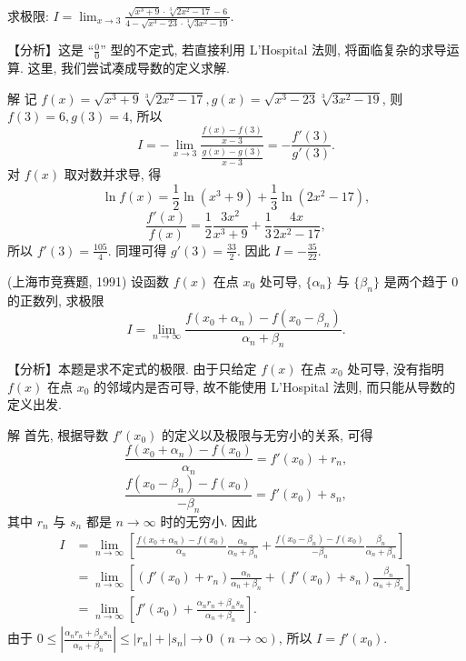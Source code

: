 \documentclass[lang=cn,newtx,10pt,scheme=chinese]{elegantbook}
\begin{document}
\begin{example}
  求极限: $I = \lim_{x \to 3} \frac{\sqrt{x^3 + 9} \cdot \sqrt[3]{2x^2 - 17} - 6}{4 - \sqrt{x^3 - 23} \cdot \sqrt[3]{3x^2 - 19}}$.
\end{example}
\begin{solution}
  【分析】这是 “$\frac{0}{0}$” 型的不定式, 若直接利用 L'Hospital 法则, 将面临复杂的求导运算. 这里, 我们尝试凑成导数的定义求解.

  解 记 $f(x) = \sqrt{x^3 + 9} \sqrt[3]{2x^2 - 17}, g(x) = \sqrt{x^3 - 23} \sqrt[3]{3x^2 - 19}$, 则 $f(3) = 6, g(3) = 4$, 所以
  $$
  I = -\lim_{x \to 3} \frac{\frac{f(x) - f(3)}{x - 3}}{\frac{g(x) - g(3)}{x - 3}} = -\frac{f'(3)}{g'(3)}.
  $$
  对 $f(x)$ 取对数并求导, 得
  $$
  \ln f(x) = \frac{1}{2} \ln(x^3 + 9) + \frac{1}{3} \ln(2x^2 - 17),
  $$
  $$
  \frac{f'(x)}{f(x)} = \frac{1}{2} \frac{3x^2}{x^3 + 9} + \frac{1}{3} \frac{4x}{2x^2 - 17},
  $$
  所以 $f'(3) = \frac{105}{4}$. 同理可得 $g'(3) = \frac{33}{2}$. 因此 $I = -\frac{35}{22}$.
\end{solution}
\begin{example}
  (上海市竞赛题, 1991) 设函数 $f(x)$ 在点 $x_0$ 处可导, $\{\alpha_n\}$ 与 $\{\beta_n\}$ 是两个趋于 0 的正数列, 求极限
  $$
  I = \lim_{n \to \infty} \frac{f(x_0 + \alpha_n) - f(x_0 - \beta_n)}{\alpha_n + \beta_n}.
  $$
\end{example}
\begin{solution}
  【分析】本题是求不定式的极限. 由于只给定 $f(x)$ 在点 $x_0$ 处可导, 没有指明 $f(x)$ 在点 $x_0$ 的邻域内是否可导, 故不能使用 L'Hospital 法则, 而只能从导数的定义出发.

  解 首先, 根据导数 $f'(x_0)$ 的定义以及极限与无穷小的关系, 可得
  $$
  \frac{f(x_0 + \alpha_n) - f(x_0)}{\alpha_n} = f'(x_0) + r_n,
  $$
  $$
  \frac{f(x_0 - \beta_n) - f(x_0)}{-\beta_n} = f'(x_0) + s_n,
  $$
  其中 $r_n$ 与 $s_n$ 都是 $n \to \infty$ 时的无穷小. 因此
  $$
  \begin{aligned}
  I &= \lim_{n \to \infty} \left[ \frac{f(x_0 + \alpha_n) - f(x_0)}{\alpha_n} \frac{\alpha_n}{\alpha_n + \beta_n} + \frac{f(x_0 - \beta_n) - f(x_0)}{-\beta_n} \frac{\beta_n}{\alpha_n + \beta_n} \right] \\
  &= \lim_{n \to \infty} \left[ (f'(x_0) + r_n) \frac{\alpha_n}{\alpha_n + \beta_n} + (f'(x_0) + s_n) \frac{\beta_n}{\alpha_n + \beta_n} \right] \\
  &= \lim_{n \to \infty} \left[ f'(x_0) + \frac{\alpha_n r_n + \beta_n s_n}{\alpha_n + \beta_n} \right].
  \end{aligned}
  $$
  由于 $0 \le \left| \frac{\alpha_n r_n + \beta_n s_n}{\alpha_n + \beta_n} \right| \le |r_n| + |s_n| \to 0 \; (n \to \infty)$, 所以 $I = f'(x_0)$.
\end{solution}
\end{document}
